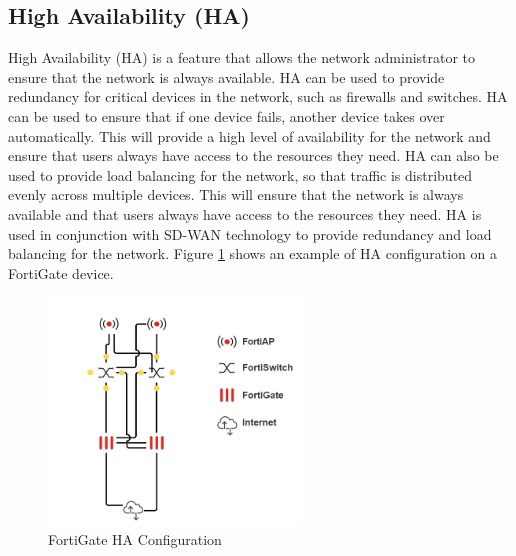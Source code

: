 \documentclass[12pt]{report}
\begin{document}
\subsection{High Availability (HA)}
High Availability (HA) is a feature that allows the network administrator to ensure that the network is always available. HA can be used to provide redundancy for critical devices in the network, such as firewalls and switches. HA can be used to ensure that if one device fails, another device takes over automatically. This will provide a high level of availability for the network and ensure that users always have access to the resources they need. HA can also be used to provide load balancing for the network, so that traffic is distributed evenly across multiple devices. This will ensure that the network is always available and that users always have access to the resources they need. HA is used in conjunction with SD-WAN technology to provide redundancy and load balancing for the network. Figure \ref{fig:HA} shows an example of HA configuration on a FortiGate device.
\begin{figure}[h]
    \centering
    \includegraphics[width=0.6\textwidth]{images/HA.png}
    \caption{FortiGate HA Configuration}
    \label{fig:HA}
\end{figure}
\newpage
\end{document}
